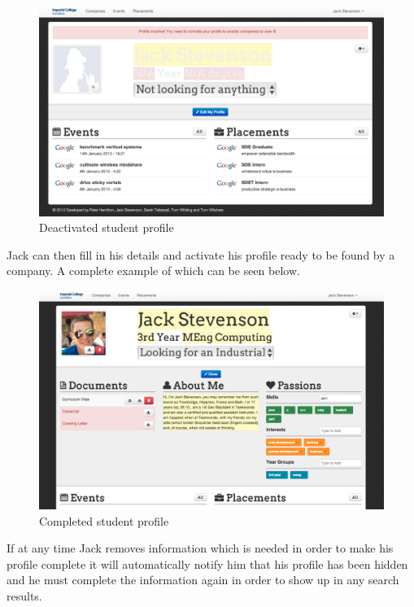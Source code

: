     \begin{figure}[H]\centering
    \includegraphics[scale=0.3]{images/user_experiences/student/sign_up_deactivate}
    \caption{Deactivated student profile}
    \end{figure}

    Jack can then fill in his details and activate his profile ready to be found by a company.
    A complete example of which can be seen below.
    
    \begin{figure}[H]\centering
    \includegraphics[scale=0.3]{images/user_experiences/student/edit_complete}
    \caption{Completed student profile}
    \end{figure}

    If at any time Jack removes information which is needed in order to make his profile complete it will automatically notify him that his profile has been hidden and he must complete the information again in order to show up in any search results.

